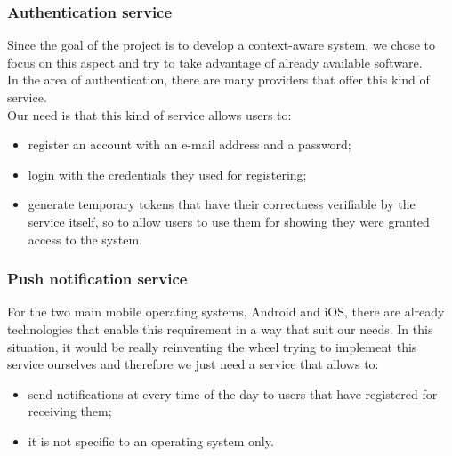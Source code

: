 \documentclass[../../main]{subfiles}
\begin{document}
\subsubsection{Authentication service}
Since the goal of the project is to develop a context-aware system, we chose to focus on this aspect and try to take advantage of already available software.\\
In the area of authentication, there are many providers that offer this kind of service.\\
Our need is that this kind of service allows users to:
\begin{itemize}
    \item register an account with an e-mail address and a password;
    \item login with the credentials they used for registering;
    \item generate temporary tokens that have their correctness verifiable by the service itself, so to allow users to use them for showing they were granted access to the system.
\end{itemize}

\subsubsection{Push notification service}
For the two main mobile operating systems, Android and iOS, there are already technologies that enable this requirement in a way that suit our needs.
In this situation, it would be really reinventing the wheel trying to implement this service ourselves and therefore we just need a service that allows to:
\begin{itemize}
    \item send notifications at every time of the day to users that have registered for receiving them;
    \item it is not specific to an operating system only.
\end{itemize}
\end{document}
